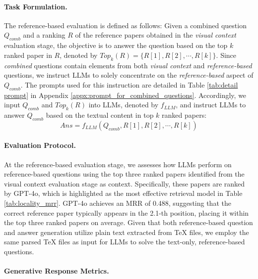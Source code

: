 \paragraph{Task Formulation.}
The reference-based evaluation is defined as follows:
Given a combined question $Q_{comb}$ and a ranking $R$ of the reference papers obtained in the \emph{visual context} evaluation stage, the objective is to answer the question based on the top $k$ ranked paper in $R$, denoted by $\textit{Top}_k(R) = \{R[1], R[2], \cdots, R[k]\}$. 
%
Since \emph{combined} questions contain elements from both \emph{visual context} and \emph{reference-based} questions, we instruct LLMs to solely concentrate on the \emph{reference-based} aspect of $Q_{comb}$. 
%
The prompts used for this instruction are detailed in Table \ref{tab:detail prompt} in Appendix \ref{appx:prompt_for_combined_questions}.
%
Accordingly, we input $Q_{comb}$ and $\textit{Top}_k(R)$ into LLMs, denoted by $f_{LLM}$, and instruct LLMs to answer $Q_{comb}$ based on the textual content in top $k$ ranked papers: 
\begin{equation*}
    \textit{Ans} = f_{LLM}(Q_{comb}, R[1], R[2], \cdots, R[k])
\end{equation*}


\paragraph{Evaluation Protocol.}

At the reference-based evaluation stage, we assesses how LLMs perform on reference-based questions using the top three ranked papers identified from the visual context evaluation stage as context. 
%
Specifically, these papers are ranked by GPT-4o, which is highlighted as the most effective retrieval model in Table \ref{tab:locality_mrr}. GPT-4o achieves an MRR of 0.488, suggesting that the correct reference paper typically appears in the 2.1-th position, placing it within the top three ranked papers on average.
%
Given that both reference-based question and answer generation utilize plain text extracted from TeX files, we employ the same parsed TeX files as input for LLMs to solve the text-only, reference-based questions. 


\paragraph{Generative Response Metrics.}

